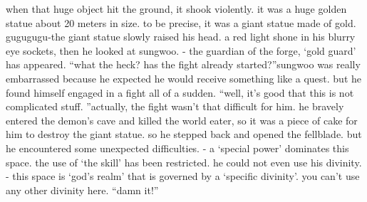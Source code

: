 when that huge object hit the ground, it shook violently.
 it was a huge golden statue about 20 meters in size.
 to be precise, it was a giant statue made of gold.
gugugugu-the giant statue slowly raised his head.
 a red light shone in his blurry eye sockets, then he looked at sungwoo.
- the guardian of the forge, ‘gold guard’ has appeared.
“what the heck? has the fight already started?”sungwoo was really embarrassed because he expected he would receive something like a quest.
 but he found himself engaged in a fight all of a sudden.
“well, it’s good that this is not complicated stuff.
”actually, the fight wasn’t that difficult for him.
 he bravely entered the demon’s cave and killed the world eater, so it was a piece of cake for him to destroy the giant statue.
so he stepped back and opened the fellblade.
 but he encountered some unexpected difficulties.
- a ‘special power’ dominates this space.
 the use of ‘the skill’ has been restricted.
he could not even use his divinity.
- this space is ‘god’s realm’ that is governed by a ‘specific divinity’.
 you can’t use any other divinity here.
“damn it!”

 